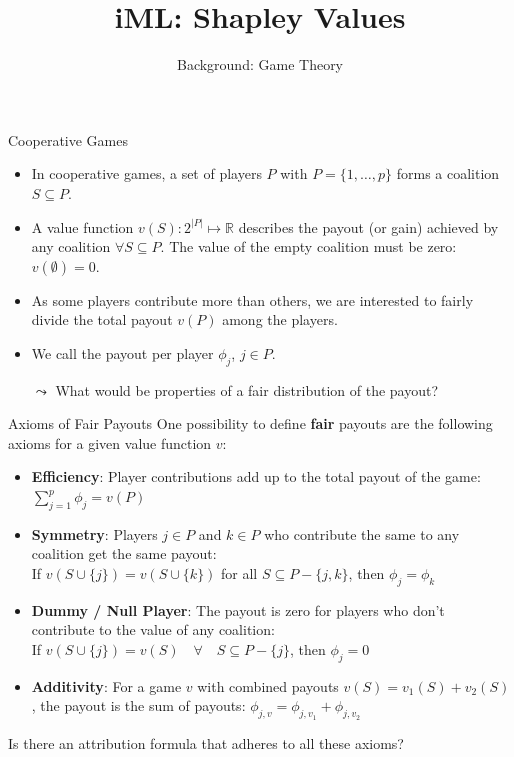 \documentclass[aspectratio=169]{../latex_main/tntbeamer}  %
\title[Introduction]{iML: Shapley Values}
\subtitle{Background: Game Theory}
\begin{document}
	
	\maketitle
	
\begin{frame}{Cooperative Games}
\begin{itemize}
  \item In cooperative games, a \alert{set of players $P$} with $P = \{1, \hdots, p\}$ forms a coalition $S \subseteq P$. 
  \pause
  \item A \alert{value function $v(S): 2^{|P|}\mapsto \mathbb{R}$} describes the payout (or gain) achieved by any coalition $\forall S \subseteq P$. The value of the empty coalition must be zero: $v(\emptyset) = 0$.
  \pause
  \item As some players contribute more than others, we are interested to fairly divide the total payout $v(P)$ among the players.
  \pause
  \item We call the \alert{payout per player $\phi_j$}, $j \in P$.
  \pause
  \bigskip
  \item[$\leadsto$] What would be properties of a fair distribution of the payout?
\end{itemize}
\end{frame}


\begin{frame}{Axioms of Fair Payouts}
  One possibility to define \textbf{fair} payouts are the following axioms for a given value function $v$:
  \begin{itemize}
    \item \textbf{Efficiency}: Player contributions add up to the total payout of the game:
      $\sum\nolimits_{j=1}^p\phi_j = v(P)$
    \pause
    \item \textbf{Symmetry}: Players $j\in P$ and $k \in P$ who contribute the same to any coalition get the same payout: \\
      If $v(S \cup \{j\}) = v(S \cup \{k\})$ for all $S \subseteq P - \{j,k\}$, then $\phi_j=\phi_k$
    \pause
    \item \textbf{Dummy / Null Player}: The payout is zero for players who don't contribute to the value of any coalition: \\
      If $v(S \cup \{j\})=v(S)\quad  \forall \quad S \subseteq P - \{j\}$, then $\phi_j=0$
    \pause
    \item \textbf{Additivity}: For a game $v$ with combined payouts $v(S) = v_1(S) + v_2(S)$, the payout is the sum of payouts: $\phi_{j,v} = \phi_{j,v_1} + \phi_{j, v_2}$
  \end{itemize}

  \pause
  Is there an attribution formula that adheres to all these axioms?

\end{frame}
\end{document}
